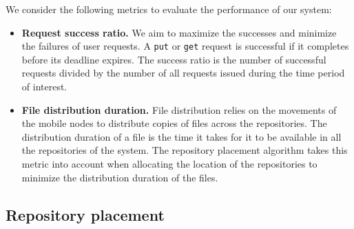 We consider the following metrics to evaluate the performance of our system:
\begin{itemize}

    \item \textbf{Request success ratio.} We aim to maximize the successes and minimize the failures of user requests. A \texttt{put} or \texttt{get} request is successful if it completes before its deadline expires. The success ratio is the number of successful requests divided by the number of all requests issued during the time period of interest. 

    \item \textbf{File distribution duration.} File distribution relies on the movements of the mobile nodes to distribute copies of files across the repositories. The distribution duration of a file is the time it takes for it to be available in all the repositories of the system. The repository placement algorithm takes this metric into account when allocating the location of the repositories to minimize the distribution duration of the files.

\end{itemize}


\subsection{Repository placement}
\label{sec:repo-placement}

